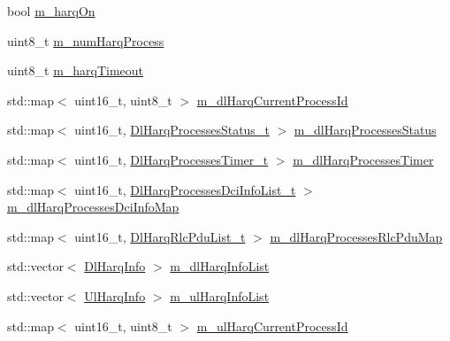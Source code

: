 \begin{DoxyCompactItemize}
\item 
bool \hyperlink{classns3_1_1MmWaveFlexTtiMacScheduler_a832729b006315bb770e9f50c16305118}{m\+\_\+harq\+On}
\item 
uint8\+\_\+t \hyperlink{classns3_1_1MmWaveFlexTtiMacScheduler_a03f7eeb64e0459c5e0e1e5320937fdb4}{m\+\_\+num\+Harq\+Process}
\item 
uint8\+\_\+t \hyperlink{classns3_1_1MmWaveFlexTtiMacScheduler_a1730a31adaecea129d43e763fc194b53}{m\+\_\+harq\+Timeout}
\item 
std\+::map$<$ uint16\+\_\+t, uint8\+\_\+t $>$ \hyperlink{classns3_1_1MmWaveFlexTtiMacScheduler_ad4e26631bc981c2a16a7e4cc40dc8d5a}{m\+\_\+dl\+Harq\+Current\+Process\+Id}
\item 
std\+::map$<$ uint16\+\_\+t, \hyperlink{classns3_1_1MmWaveFlexTtiMacScheduler_afdca7f52a7350da97088138d59473f9a}{Dl\+Harq\+Processes\+Status\+\_\+t} $>$ \hyperlink{classns3_1_1MmWaveFlexTtiMacScheduler_a7ea48669590368853d16240acf7dbebe}{m\+\_\+dl\+Harq\+Processes\+Status}
\item 
std\+::map$<$ uint16\+\_\+t, \hyperlink{classns3_1_1MmWaveFlexTtiMacScheduler_a88d19a5582694a885d76e6abde60691b}{Dl\+Harq\+Processes\+Timer\+\_\+t} $>$ \hyperlink{classns3_1_1MmWaveFlexTtiMacScheduler_a321e6f7863545e750acf6e94855514c5}{m\+\_\+dl\+Harq\+Processes\+Timer}
\item 
std\+::map$<$ uint16\+\_\+t, \hyperlink{classns3_1_1MmWaveFlexTtiMacScheduler_a0f9a8851fce0c15b30cbbb0a6afe6a93}{Dl\+Harq\+Processes\+Dci\+Info\+List\+\_\+t} $>$ \hyperlink{classns3_1_1MmWaveFlexTtiMacScheduler_a2820fea8cd85e2351bc0b046bdfb8414}{m\+\_\+dl\+Harq\+Processes\+Dci\+Info\+Map}
\item 
std\+::map$<$ uint16\+\_\+t, \hyperlink{classns3_1_1MmWaveFlexTtiMacScheduler_ad9f4f50bc7aba7e6471b03b6904888b4}{Dl\+Harq\+Rlc\+Pdu\+List\+\_\+t} $>$ \hyperlink{classns3_1_1MmWaveFlexTtiMacScheduler_a7b37cf0428128dbfe578cd3c5d3ffbe9}{m\+\_\+dl\+Harq\+Processes\+Rlc\+Pdu\+Map}
\item 
std\+::vector$<$ \hyperlink{structns3_1_1DlHarqInfo}{Dl\+Harq\+Info} $>$ \hyperlink{classns3_1_1MmWaveFlexTtiMacScheduler_af30d399e8abceedfe762a84ea26336b6}{m\+\_\+dl\+Harq\+Info\+List}
\item 
std\+::vector$<$ \hyperlink{structns3_1_1UlHarqInfo}{Ul\+Harq\+Info} $>$ \hyperlink{classns3_1_1MmWaveFlexTtiMacScheduler_ae98000612167824fd24cdca1f812bc60}{m\+\_\+ul\+Harq\+Info\+List}
\item 
std\+::map$<$ uint16\+\_\+t, uint8\+\_\+t $>$ \hyperlink{classns3_1_1MmWaveFlexTtiMacScheduler_af4568af6e89ccd5261aa385d4e3e339d}{m\+\_\+ul\+Harq\+Current\+Process\+Id}

\end{DoxyCompactItemize}
